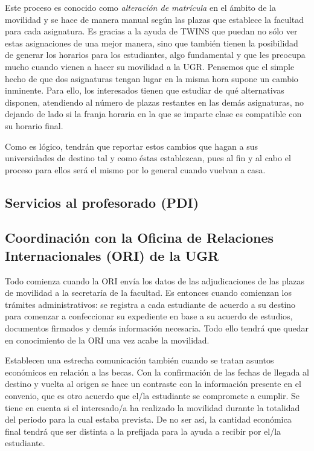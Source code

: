 Este proceso es conocido como \textit{alteración de matrícula} en el ámbito de la movilidad y se hace de manera manual según las plazas que establece la facultad para cada asignatura. Es gracias a la ayuda de TWINS que puedan no sólo ver estas asignaciones de una mejor manera, sino que también tienen la posibilidad de generar los horarios para los estudiantes, algo fundamental y que les preocupa mucho cuando vienen a hacer su movilidad a la UGR. Pensemos que el simple hecho de que dos asignaturas tengan lugar en la misma hora supone un cambio inminente. Para ello, los interesados tienen que estudiar de qué alternativas disponen, atendiendo al número de plazas restantes en las demás asignaturas, no dejando de lado si la franja horaria en la que se imparte clase es compatible con su horario final.

Como es lógico, tendrán que reportar estos cambios que hagan a sus universidades de destino tal y como éstas establezcan, pues al fin y al cabo el proceso para ellos será el mismo por lo general cuando vuelvan a casa.


\subsection{Servicios al profesorado (PDI)}





\subsection{Coordinación con la Oficina de Relaciones Internacionales (ORI) de la UGR}

Todo comienza cuando la ORI envía los datos de las adjudicaciones de las plazas de movilidad a la secretaría de la facultad. Es entonces cuando comienzan los trámites administrativos: se registra a cada estudiante de acuerdo a su destino para comenzar a confeccionar su expediente en base a su acuerdo de estudios, documentos firmados y demás información necesaria. Todo ello tendrá que quedar en conocimiento de la ORI una vez acabe la movilidad.

Establecen una estrecha comunicación también cuando se tratan asuntos económicos en relación a las becas. Con la confirmación de las fechas de llegada al destino y vuelta al origen se hace un contraste con la información presente en el convenio, que es otro acuerdo que el/la estudiante se compromete a cumplir. Se tiene en cuenta si el interesado/a ha realizado la movilidad durante la totalidad del periodo para la cual estaba prevista. De no ser así, la cantidad económica final tendrá que ser distinta a la prefijada para la ayuda a recibir por el/la estudiante.

